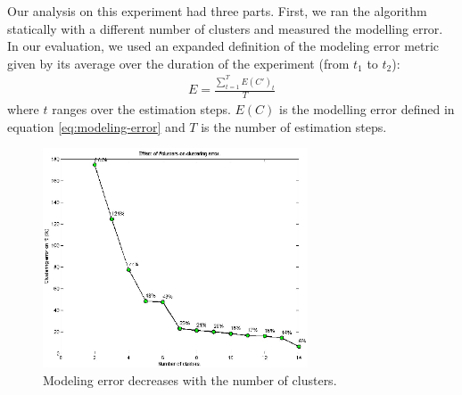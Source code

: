   Our analysis on this experiment had three parts. First, we ran the algorithm statically with a different number of clusters and measured the modelling error. In our evaluation, we used an expanded definition of the modeling error metric given by its average over the duration of the experiment (from $t_1$ to $t_2$): 
 \begin{align} 
 E=\frac{\sum^T_{t=1}{E(C')_{t}}}{T} 
  \end{align} 
where $t$ ranges over the estimation steps. $E(C)$ is the modelling error defined in equation \ref{eq:modeling-error} and $T$ is the number of estimation steps. 
\begin{figure}[htbp]
	\centering
	\includegraphics[width=0.7\textwidth]{image/modeling-error-vs-num-cluster.eps}
	\caption[The relationship between the modeling error and the number of clusters.]{Modeling error decreases with the number of clusters.}
	\label{fig:modeling-error-decreases}
\end{figure}


